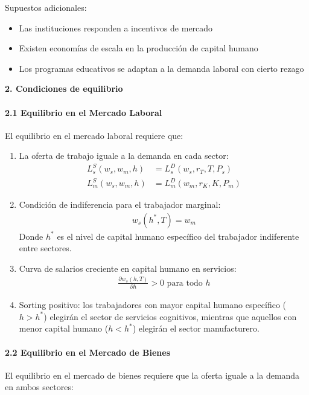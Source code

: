 \documentclass{article}
\theoremstyle{remark}
\theoremstyle{definition}
\begin{document}
\begin{tcolorbox}
Supuestos adicionales:
\begin{itemize}
\item Las instituciones responden a incentivos de mercado
\item Existen economías de escala en la producción de capital humano
\item Los programas educativos se adaptan a la demanda laboral con cierto rezago
\end{itemize}

\textbf{2. Condiciones de equilibrio}

\paragraph{2.1 Equilibrio en el Mercado Laboral}
El equilibrio en el mercado laboral requiere que:

\begin{enumerate}
\item La oferta de trabajo iguale a la demanda en cada sector:
\begin{align}
L_s^S(w_s, w_m, h) &= L_s^D(w_s, r_T, T, P_s)\\
L_m^S(w_s, w_m, h) &= L_m^D(w_m, r_K, K, P_m)
\end{align}

\item Condición de indiferencia para el trabajador marginal:
\begin{align}
w_s(h^*, T) = w_m
\end{align}
Donde $h^*$ es el nivel de capital humano específico del trabajador indiferente entre sectores.

\item Curva de salarios creciente en capital humano en servicios:
\begin{align}
\frac{\partial w_s(h,T)}{\partial h} > 0 \text{ para todo } h
\end{align}

\item Sorting positivo: los trabajadores con mayor capital humano específico ($h > h^*$) elegirán el sector de servicios cognitivos, mientras que aquellos con menor capital humano ($h < h^*$) elegirán el sector manufacturero.
\end{enumerate}

\paragraph{2.2 Equilibrio en el Mercado de Bienes}
El equilibrio en el mercado de bienes requiere que la oferta iguale a la demanda en ambos sectores:


\end{tcolorbox}
\end{document}
